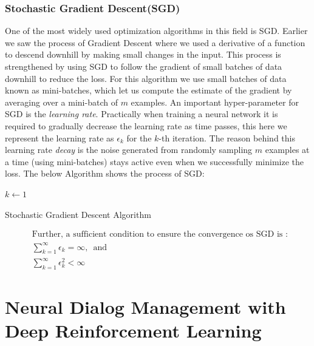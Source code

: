 \documentclass[14pt]{extarticle}
\numberwithin{equation}{section}
\begin{document}
	\subsubsection{Stochastic Gradient Descent(SGD)}\label{sgd}
	One of the most widely used optimization algorithms in this field is SGD. Earlier we saw the process of Gradient Descent where we used a derivative of a function to descend downhill by making small changes in the input. This process is strengthened by using SGD to follow the gradient of small batches of data downhill to reduce the loss. For this algorithm we use small batches of data known as mini-batches, which let us compute the estimate of the gradient by averaging over a mini-batch of $m$ examples. An important hyper-parameter for SGD is the \textit{learning rate}. Practically when training a neural network it is required to gradually decrease the learning rate as time passes, this here we represent the learning rate as $\epsilon_k$ for the $k$-th iteration. The reason behind this learning rate \textit{decay} is the noise generated from randomly sampling $m$ examples at a time (using mini-batches) stays active even when we successfully minimize the loss. The below Algorithm shows the process of SGD: 
	\begin{algorithm}[H]
		\DontPrintSemicolon
		\SetAlgoLined
		$k \gets 1$\;
		\caption{Stochastic Gradient Descent Algorithm}\label{alg:sgd}
	\end{algorithm}
	
	\begin{align}
	&\text{Further, a sufficient condition to ensure the convergence os SGD is : }\nonumber\\
	&\sum_{k=1}^{\infty}\epsilon_k = \infty \text{,     {}{}    and}\\
	&\sum_{k=1}^{\infty}\epsilon_k^2 < \infty
	\end{align}
	\pagebreak
	
	\section[Neural Dialog Management]{Neural Dialog Management  with Deep Reinforcement Learning}\label{dm-with-drl}
\end{document}

